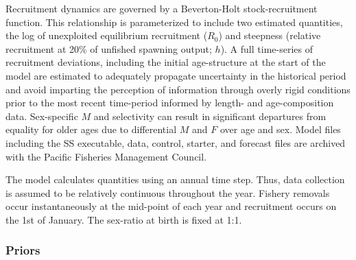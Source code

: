 \documentclass[11pt,
  english,
  a4paper,
]{article}
\begin{document}
\leavevmode\tagmcend\tagstructend\par


Recruitment dynamics are governed by a Beverton-Holt stock-recruitment function. This relationship is parameterized to include two estimated quantities, the log of unexploited equilibrium recruitment ({\(R_0\)\leavevmode\tagmcend\tagstructend}) and steepness (relative recruitment at 20\% of unfished spawning output; {\(h\)\leavevmode\tagmcend\tagstructend}). A full time-series of recruitment deviations, including the initial age-structure at the start of the model are estimated to adequately propagate uncertainty in the historical period and avoid imparting the perception of information through overly rigid conditions prior to the most recent time-period informed by length- and age-composition data. Sex-specific {\(M\)\leavevmode\tagmcend\tagstructend} and selectivity can result in significant departures from equality for older ages due to differential {\(M\)\leavevmode\tagmcend\tagstructend} and {\(F\)\leavevmode\tagmcend\tagstructend} over age and sex. Model files including the SS executable, data, control, starter, and forecast files are archived with the Pacific Fisheries Management Council.

\leavevmode\tagmcend\tagstructend\par


The model calculates quantities using an annual time step. Thus, data collection is assumed to be relatively continuous throughout the year. Fishery removals occur instantaneously at the mid-point of each year and recruitment occurs on the 1st of January. The sex-ratio at birth is fixed at 1:1.

\leavevmode\tagmcend\tagstructend\par


\hypertarget{priors}{%
\subsubsection{Priors}\label{priors}}
\end{document}
